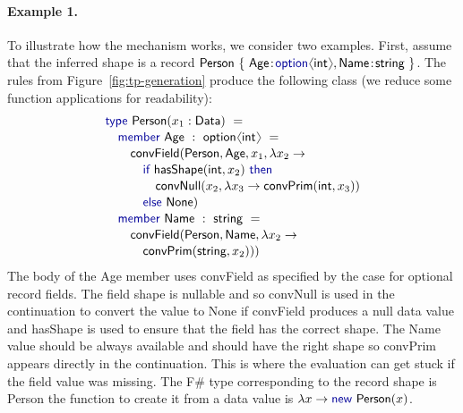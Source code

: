 \documentclass[10pt,preprint,blind,clearpagebib]{sigplanconf}
\newcommand{\langl}{\begin{picture}(4.5,7)
\put(1.1,2.5){\rotatebox{60}{\line(1,0){5.5}}}
\put(1.1,2.5){\rotatebox{300}{\line(1,0){5.5}}}
\end{picture}}
\newcommand{\rangl}{\begin{picture}(4.5,7)
\put(.9,2.5){\rotatebox{120}{\line(1,0){5.5}}}
\put(.9,2.5){\rotatebox{240}{\line(1,0){5.5}}}
\end{picture}}
\newcommand{\kvd}[1]{\textnormal{\textcolor{kvdclr}{\sffamily #1}}}
\newcommand{\ident}[1]{\textnormal{\sffamily #1}}
\begin{document}

\paragraph{Example 1.}
To illustrate how the mechanism works, we consider two examples. First, assume 
that the inferred shape is a record  
$\ident{Person}~\{~\ident{Age}\!:\!\kvd{option}\langl\ident{int}\rangl, \ident{Name}\!:\!\ident{string}~ \}$. 
The rules from Figure~\ref{fig:tp-generation} produce the following class (we reduce some 
function applications for readability):
%
\vspace{-0.1em}
\begin{equation*}
\begin{array}{l}
 \kvd{type}~\ident{Person}(x_1:\ident{Data})~= \\[0.1em]
 \quad \kvd{member}~\ident{Age}~:~\ident{option}\langl\ident{int}\rangl~= \\[0.1em]
 \qquad \ident{convField}(\ident{Person}, \ident{Age}, x_1, \lambda x_2 \rightarrow \\[0.1em]
 \qquad \quad \kvd{if}~\ident{hasShape}(\ident{int}, x_2)~\kvd{then} \\[0.1em]
 \qquad \quad \quad \ident{convNull}(x_2, \lambda x_3\rightarrow\ident{convPrim}(\ident{int}, x_3)) \\[0.1em]
 \qquad \quad \kvd{else}~\ident{None})\\[0.1em]
 \quad \kvd{member}~\ident{Name}~:~\ident{string}~= \\[0.1em]
 \qquad \ident{convField}(\ident{Person},\ident{Name}, \lambda x_2 \rightarrow \\[0.1em]
 \qquad \quad \ident{convPrim}(\ident{string}, x_2)))
\end{array}
\end{equation*}
%
The body of the \ident{Age} member uses \ident{convField} as specified by the case for optional
record fields. The field shape is nullable and so \ident{convNull} is used in the continuation to 
convert the value to \ident{None} if \ident{convField} produces a \kvd{null} data value and 
\ident{hasShape} is used to ensure that the field has the correct shape. The \ident{Name} value should
be always available and should have the right shape so \ident{convPrim} appears directly in the 
continuation. This is where the evaluation can get stuck if the field value was missing. The F\# 
type corresponding to the record shape is \ident{Person} the function to create it from a data value 
is $\lambda x \rightarrow \kvd{new}~\ident{Person}(x)$.
\end{document}
